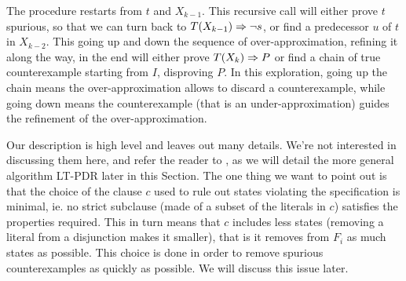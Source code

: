 The procedure restarts from $t$ and $X_{k-1}$. This recursive call will either prove $t$ spurious, so that we can turn back to $T(X_{k-1}) \Rightarrow \lnot s$, or find a predecessor $u$ of $t$ in $X_{k-2}$. This going up and down the sequence of over-approximation, refining it along the way, in the end will either prove $T(X_k) \Rightarrow P$ or find a chain of true counterexample starting from $I$, disproving $P$.
In this exploration, going up the chain means the over-approximation allows to discard a counterexample, while going down means the counterexample (that is an under-approximation) guides the refinement of the over-approximation.

Our description is high level and leaves out many details. We're not interested in discussing them here, and refer the reader to \cite{Bradley11}, as we will detail the more general algorithm LT-PDR later in this Section. The one thing we want to point out is that the choice of the clause $c$ used to rule out states violating the specification is minimal, ie. no strict subclause (made of a subset of the literals in $c$) satisfies the properties required. This in turn means that $c$ includes less states (removing a literal from a disjunction makes it smaller), that is it removes from $F_i$ as much states as possible. This choice is done in order to remove spurious counterexamples as quickly as possible. We will discuss this issue later.

